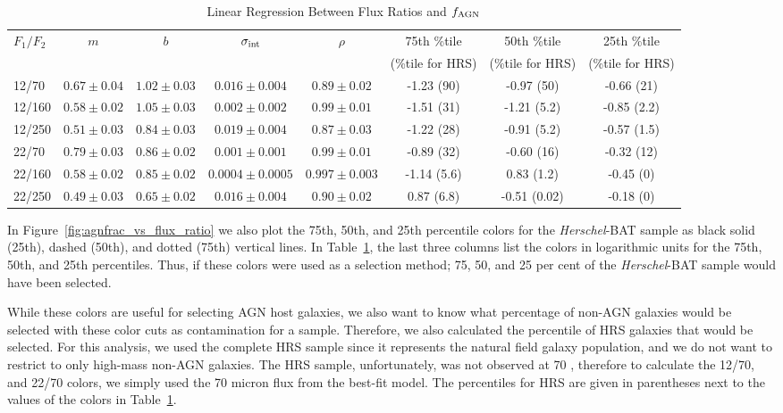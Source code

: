 \documentclass[fleqn, usenatbib]{mnras}
\newcommand{\herschel}{\emph{Herschel}}
\begin{document}
\begin{table}
\begin{threeparttable}
\captionsetup{font=small,labelfont=bf,labelsep=period}
\caption{Linear Regression Between Flux Ratios and $f_{\rm AGN}$\label{tab:flux_ratio_fagn_linreg}}
\begin{tabular}{lccccccc}
\toprule 
$F_{1}/F_{2}$ & $m$ & $b$  & $\sigma_{\rm int}$ & $\rho$ & 75th \%tile  & 50th \%tile  & 25th \%tile\\
&&&&&(\%tile for HRS)&(\%tile for HRS)&(\%tile for HRS)\\
\midrule
12/70      & $0.67\pm0.04$ & $1.02\pm0.03$ & $0.016\pm0.004$ & $0.89\pm0.02$ & -1.23 (90) & -0.97 (50) & -0.66 (21)\\
12/160    & $0.58\pm0.02$ & $1.05\pm0.03$ & $0.002\pm0.002$ & $0.99\pm0.01$ & -1.51 (31) & -1.21 (5.2) & -0.85 (2.2)\\
12/250    & $0.51\pm0.03$ & $0.84\pm0.03$ & $0.019\pm0.004$ & $0.87\pm0.03$ & -1.22 (28) &  -0.91 (5.2) & -0.57 (1.5)\\
22/70      & $0.79\pm0.03$ & $0.86\pm0.02$ & $0.001\pm0.001$ & $0.99\pm0.01$ & -0.89 (32) & -0.60 (16) & -0.32 (12)\\
22/160    & $0.58\pm0.02$ & $0.85\pm0.02$ & $0.0004\pm0.0005$ & $0.997\pm0.003$ & -1.14 (5.6) & 0.83 (1.2) & -0.45 (0)\\
22/250    & $0.49\pm0.03$ & $0.65\pm0.02$ & $0.016\pm0.004$ & $0.90\pm0.02$ & 0.87 (6.8) & -0.51 (0.02) & -0.18 (0) \\
\bottomrule
\end{tabular}
\end{threeparttable}
\end{table}

In Figure~\ref{fig:agnfrac_vs_flux_ratio} we also plot the 75th, 50th, and 25th percentile colors for the \herschel-BAT sample as black solid (25th), dashed (50th), and dotted (75th) vertical lines. In Table~\ref{tab:flux_ratio_fagn_linreg}, the last three columns list the colors in logarithmic units for the 75th, 50th, and 25th percentiles. Thus, if these colors were used as a selection method; 75, 50, and 25 per cent of the \herschel-BAT sample would have been selected.

While these colors are useful for selecting AGN host galaxies, we also want to know what percentage of non-AGN galaxies would be selected with these color cuts as contamination for a sample. Therefore, we also calculated the percentile of HRS galaxies that would be selected. For this analysis, we used the complete HRS sample since it represents the natural field galaxy population, and we do not want to restrict to only high-mass non-AGN galaxies. The HRS sample, unfortunately, was not observed at 70 \micron, therefore to calculate the 12/70, and 22/70 colors, we simply used the 70 micron flux from the best-fit model. The percentiles for HRS are given in parentheses next to the values of the colors in Table~\ref{tab:flux_ratio_fagn_linreg}. 
\end{document}

